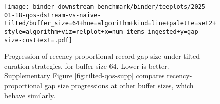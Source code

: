\begin{figure}
\texttt{[image: binder-downstream-benchmark/binder/teeplots/2025-01-18-qos-dstream-vs-naive-tilted/buffer\_size=64+hue=algorithm+kind=line+palette=set2+style=algorithm+viz=relplot+x=num-items-ingested+y=gap-size-cost+ext=.pdf]}
\caption{%
Progression of recency-proportional record gap size under tilted curation strategies, for buffer size 64.
\footnotesize
Lower is better.
Supplementary Figure \ref{fig:tilted-qos-supp} compares recency-proportional gap size progressions at other buffer sizes, which behave similarly.
}
\label{fig:tilted-qos}
\end{figure}
